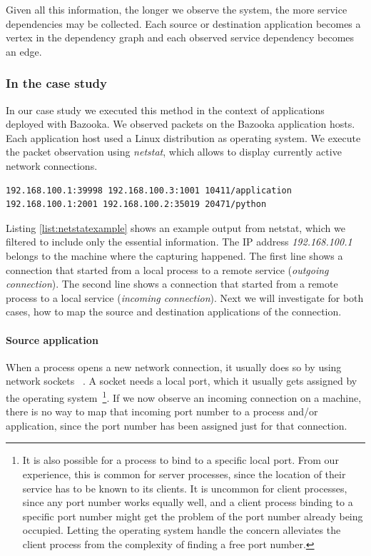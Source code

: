 Given all this information, the longer we observe the system, the more service dependencies may be collected. Each source or destination application becomes a vertex in the dependency graph and each observed service dependency becomes an edge.

\subsubsection{In the case study}

In our case study we executed this method in the context of applications deployed with Bazooka. We observed packets on the Bazooka application hosts. Each application host used a Linux distribution as operating system. We execute the packet observation using \emph{netstat}, which allows to display currently active network connections.

\begin{lstlisting}[caption=Sanitized example output from netstat. Schema is: local\_address foreign\_address process\_id/process\_name,label=list:netstatexample]
192.168.100.1:39998 192.168.100.3:1001 10411/application
192.168.100.1:2001 192.168.100.2:35019 20471/python
\end{lstlisting}

Listing \ref{list:netstatexample} shows an example output from netstat, which we filtered to include only the essential information. The IP address \emph{192.168.100.1} belongs to the machine where the capturing happened. The first line shows a connection that started from a local process to a remote service (\emph{outgoing connection}). The second line shows a connection that started from a remote process to a local service (\emph{incoming connection}). Next we will investigate for both cases, how to map the source and destination applications of the connection.


\paragraph{Source application} When a process opens a new network connection, it usually does so by using network sockets~\cite{sockets} \cite{SocketsProgramming}. A socket needs a local port, which it usually gets assigned by the operating system~\footnote{It is also possible for a process to bind to a specific local port. From our experience, this is common for server processes, since the location of their service has to be known to its clients. It is uncommon for client processes, since any port number works equally well, and a client process binding to a specific port number might get the problem of the port number already being occupied. Letting the operating system handle the concern alleviates the client process from the complexity of finding a free port number.}. If we now observe an incoming connection on a machine, there is no way to map that incoming port number to a process and/or application, since the port number has been assigned just for that connection.


